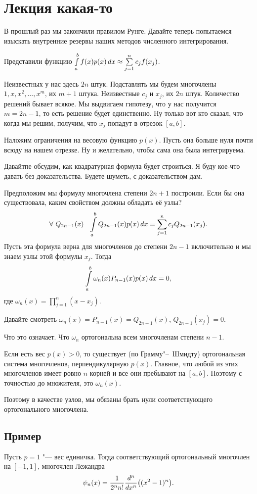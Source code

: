 \section{Лекция какая-то}
В прошлый раз мы закончили правилом Рунге. Давайте теперь попытаемся изыскать внутренние резервы наших методов численного интегрирования.

Представили функцию $\int\limits_a^b f(x)p (x)\,dx \approx \sum\limits_{j = 1}^{n} c_j f(x_j)$.

Неизвестных у нас здесь $2n$ штук. Подставлять мы будем многочлены $1,x,x^2,\dots,x^m$, их $m+1$ штука. Неизвестные $c_j$ и $x_j$, их $2n$ штук. Количество решений бывает всякое. Мы выдвигаем гипотезу, что у нас получится $m=2n-1$, то есть решение будет единственно. Ну только вот кто сказал, что когда мы решим, получим, что $x_j$ попадут в отрезок $[a,b]$.

Наложим ограничения на весовую функцию $p(x)$. Пусть она больше нуля почти всюду на нашем отрезке.
Ну и желательно, чтобы сама она была интегрируема.

Давайтпе обсудим, как квадратурная формула будет строиться. Я буду кое-что давать без доказательства. Будете шуметь, с доказательством дам.

Предположим мы формулу многочлена степени $2n+1$ построили. Если бы она существовала, каким свойством должны обладать её узлы?
\[
  \forall\ Q_{2n-1}(x)\hskip .75em plus.1em minus.08em\relax \int\limits_a^b Q_{2n-1}(x) p(x)\,dx = \sum\limits_{j = 1}^{n} c_jQ_{2n-1}(x_j).
\]
Пусть эта формула верна для многочленов до степени $2n-1$ включительно и мы знаем узлы этой формулы $x_j$. Тогда
\[
  \int\limits_a^b \omega_n(x) P_{n-1}(x) p(x)\,dx = 0,
\]
где $\omega_n(x) = \prod\limits_{j=1}^n(x-x_j)$.

Давайте смотреть $\omega_n(x) = P_{n-1}(x) = Q_{2n-1}(x)$, $Q_{2n-1}(x_j) = 0$.

Что это означает. Что $\omega_n$ ортогональна всем многочленам степени $n-1$.

Если есть вес $p(x)>0$, то существует (по Грамму"--~Шмидту) ортогональная система многочленов, перпендикулярную $p(x)$. Главное, что любой из этих многочленов имеет ровно $n$ корней и все они пребывают на $[a,b]$. Поэтому с точностью до множителя, это $\omega_n(x)$.

Поэтому в качестве узлов, мы обязаны брать нули соответствующего ортогонального многочлена.

\subsection{Пример}
Пусть $p=1$ "--- вес единичка. Тогда соответствующий ортогональный многочлен на $[-1,1]$, многочлен Лежандра
\[
  \psi_n(x) = \frac{1}{2^n n!} \frac{d^n}{dx^n} \big((x^2-1)^n\big).
\]

